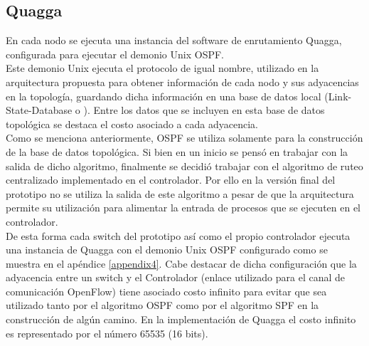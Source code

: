 
\subsection{Quagga}
En cada nodo se ejecuta una instancia del software de enrutamiento Quagga, configurada para ejecutar el demonio Unix OSPF.\\ 

Este demonio Unix ejecuta el protocolo de igual nombre, utilizado en la arquitectura propuesta para obtener información de cada nodo y sus adyacencias en la topolog\'ia, guardando dicha información en una base de datos local (Link-State-Database o ). Entre los datos que se incluyen en esta base de datos topol\'ogica se destaca el costo asociado a cada adyacencia.\\ 

Como se menciona anteriormente, OSPF se utiliza solamente para la construcci\'on de la base de datos topol\'ogica. Si bien en un inicio se pensó en trabajar con la salida de dicho algoritmo, finalmente se decidió trabajar con el algoritmo de ruteo centralizado implementado en el controlador. Por ello en la versi\'on final del prototipo no se utiliza la salida de este algoritmo a pesar de que la arquitectura permite su utilización para alimentar la entrada de procesos que se ejecuten en el controlador.\\

De esta forma cada switch del prototipo así como el propio controlador ejecuta una instancia de Quagga con el demonio Unix OSPF configurado como se muestra en el apéndice \ref{appendix4}. Cabe destacar de dicha configuración que la adyacencia entre un switch y el Controlador (enlace utilizado para el canal de comunicación OpenFlow) tiene asociado costo infinito para evitar que sea utilizado tanto por el algoritmo OSPF como por el algoritmo SPF en la construcción de algún camino. En la implementaci\'on de Quagga el costo infinito es representado por el n\'umero 65535 (16 bits).

